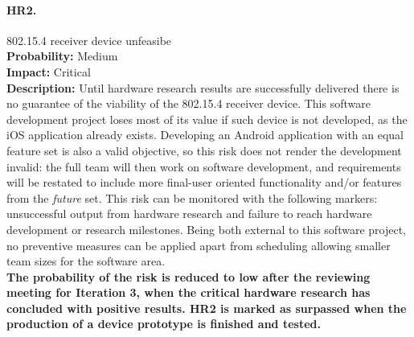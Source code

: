 		\paragraph{HR2.}802.15.4 receiver device unfeasibe\\
		\textbf{Probability:} Medium\\
		\textbf{Impact:} Critical\\
		\textbf{Description:} Until hardware research results are successfully delivered there is no guarantee of the viability of the 802.15.4 receiver device. This software development project loses most of its value if such device is not developed, as the iOS application already exists. Developing an Android application with an equal feature set is also a valid objective, so this risk does not render the development invalid: the full team will then work on software development, and requirements will be restated to include more final-user oriented functionality and/or features from the \emph{future} set.
		This risk can be monitored with the following markers: unsuccessful output from hardware research and failure to reach hardware development or research milestones. Being both external to this software project, no preventive measures can be applied apart from scheduling allowing smaller team sizes for the software area.\\
		\textbf{The probability of the risk is reduced to low after the reviewing meeting for Iteration 3, when the critical hardware research has concluded with positive results. HR2 is marked as surpassed when the production of a device prototype is finished and tested.}

